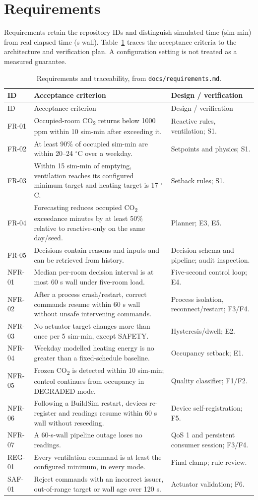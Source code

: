 \documentclass[11pt,a4paper]{article}
\begin{document}
\section{Requirements}
Requirements retain the repository IDs and distinguish simulated time (sim-min) from real elapsed time (s wall). Table~\ref{tab:req} traces the acceptance criteria to the architecture and verification plan. A configuration setting is not treated as a measured guarantee.
{\small\begin{longtable}{p{19mm}p{83mm}p{42mm}}
\caption{Requirements and traceability, from \texttt{docs/requirements.md}.}\label{tab:req}\\
\toprule ID & Acceptance criterion & Design / verification\\\midrule\endfirsthead
\toprule ID & Acceptance criterion & Design / verification\\\midrule\endhead
FR-01 & Occupied-room CO\textsubscript{2} returns below 1000 ppm within 10 sim-min after exceeding it. & Reactive rules, ventilation; S1.\\
FR-02 & At least 90\% of occupied sim-min are within 20--24 $^\circ$C over a weekday. & Setpoints and physics; S1.\\
FR-03 & Within 15 sim-min of emptying, ventilation reaches its configured minimum target and heating target is 17 $^\circ$C. & Setback rules; S1.\\
FR-04 & Forecasting reduces occupied CO\textsubscript{2} exceedance minutes by at least 50\% relative to reactive-only on the same day/seed. & Planner; E3, E5.\\
FR-05 & Decisions contain reasons and inputs and can be retrieved from history. & Decision schema and pipeline; audit inspection.\\
NFR-01 & Median per-room decision interval is at most 60 s wall under five-room load. & Five-second control loop; E4.\\
NFR-02 & After a process crash/restart, correct commands resume within 60 s wall without unsafe intervening commands. & Process isolation, reconnect/restart; F3/F4.\\
NFR-03 & No actuator target changes more than once per 5 sim-min, except SAFETY. & Hysteresis/dwell; E2.\\
NFR-04 & Weekday modelled heating energy is no greater than a fixed-schedule baseline. & Occupancy setback; E1.\\
NFR-05 & Frozen CO\textsubscript{2} is detected within 10 sim-min; control continues from occupancy in DEGRADED mode. & Quality classifier; F1/F2.\\
NFR-06 & Following a BuildSim restart, devices re-register and readings resume within 60 s wall without reseeding. & Device self-registration; F5.\\
NFR-07 & A 60-s-wall pipeline outage loses no readings. & QoS 1 and persistent consumer session; F3/F4.\\
REG-01 & Every ventilation command is at least the configured minimum, in every mode. & Final clamp; rule review.\\
SAF-01 & Reject commands with an incorrect issuer, out-of-range target or wall age over 120 s. & Actuator validation; F6.\\\bottomrule
\end{longtable}}
\end{document}
